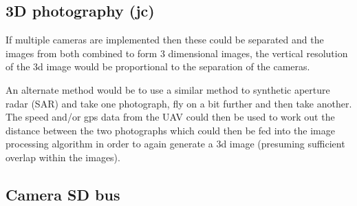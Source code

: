 \subsection{3D photography (jc)}

If multiple cameras are implemented then these could be separated and the images from both combined to form 3 dimensional images, the vertical resolution of the 3d image would be proportional to the separation of the cameras.

An alternate method would be to use a similar method to synthetic aperture radar (SAR) and take one photograph, fly on a bit further and then take another. The speed and/or gps data from the UAV could then be used to work out the distance between the two photographs which could then be fed into the image processing algorithm in order to again generate a 3d image (presuming sufficient overlap within the images).

\subsection{Camera SD bus}

